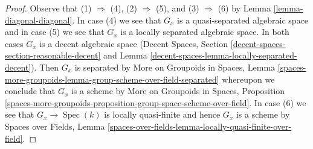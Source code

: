 \documentclass[10pt,a4paper]{amsart}
\theoremstyle{plain}
\theoremstyle{definition}
\theoremstyle{remark}
\numberwithin{equation}{subsection}
\def\Spec{\mathop{\mathrm{Spec}}}
\begin{document}
\begin{proof}
Observe that (1) $\Rightarrow$ (4), (2) $\Rightarrow$ (5), and
(3) $\Rightarrow$ (6) by
Lemma \ref{lemma-diagonal-diagonal}.
In case (4) we see that $G_x$ is a quasi-separated
algebraic space and in case (5) we see that $G_x$
is a locally separated algebraic space.
In both cases $G_x$ is a decent algebraic space
(Decent Spaces, Section \ref{decent-spaces-section-reasonable-decent} and
Lemma \ref{decent-spaces-lemma-locally-separated-decent}).
Then $G_x$ is separated by More on Groupoids in Spaces, Lemma
\ref{spaces-more-groupoids-lemma-group-scheme-over-field-separated}
whereupon we conclude that $G_x$ is a scheme by
More on Groupoids in Spaces, Proposition
\ref{spaces-more-groupoids-proposition-group-space-scheme-over-field}.
In case (6) we see that $G_x \to \Spec(k)$ is locally quasi-finite
and hence $G_x$ is a scheme by
Spaces over Fields, Lemma
\ref{spaces-over-fields-lemma-locally-quasi-finite-over-field}.
\end{proof}
\end{document}
